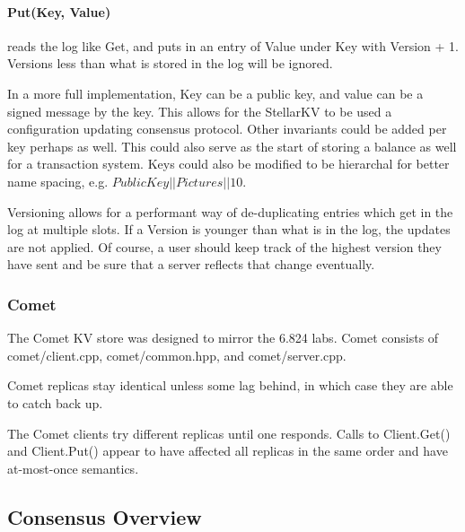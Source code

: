 \documentclass[preprint,11pt]{article} \usepackage{amsmath}
\begin{document}
\paragraph{Put(Key, Value)}  reads the log like Get, and puts in an entry of Value under Key with Version + 1. Versions less than what is stored in the log will be ignored.

In a more full implementation, Key can be a public key, and value can
be a signed message by the key. This allows for the StellarKV to be
used a configuration updating consensus protocol. Other invariants
could be added per key perhaps as well. This could also serve as the
start of storing a balance as well for a transaction system. Keys
could also be modified to be hierarchal for better name spacing, e.g.
$Public Key||Pictures||10$.

Versioning allows for a performant way of de-duplicating entries which
get in the log at multiple slots. If a Version is younger than what is
in the log, the updates are not applied. Of course, a user should keep
track of the highest version they have sent and be sure that a server
reflects that change eventually.

\subsubsection*{Comet}

The Comet KV store was designed to mirror the 6.824 labs. Comet consists of
comet/client.cpp, comet/common.hpp, and comet/server.cpp.

Comet replicas stay identical unless some lag behind, in which case they 
are able to catch back up.

The Comet clients try different replicas until one responds. Calls to Client.Get() and
Client.Put() appear to have affected all replicas in the same order and have
at-most-once semantics.

\subsection{Consensus Overview}

\begingroup
\raggedright

\endgroup
\end{document}
